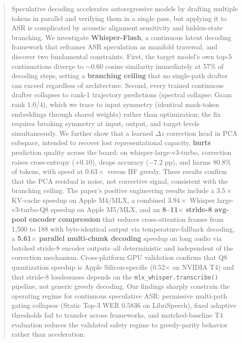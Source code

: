 \documentclass[11pt,a4paper]{article}
\begin{document}
\begin{abstract}
Speculative decoding accelerates autoregressive models by drafting multiple tokens in parallel and verifying them in a single pass, but applying it to ASR is complicated by acoustic alignment sensitivity and hidden-state branching.
We investigate \textbf{Whisper-Flash}, a continuous latent decoding framework that reframes ASR speculation as manifold traversal, and discover two fundamental constraints.
First, the target model's own top-5 continuations diverge to ${\sim}0.60$ cosine similarity immediately at 57\% of decoding steps, setting a \textbf{branching ceiling} that no single-path drafter can exceed regardless of architecture.
Second, every trained continuous drafter collapses to rank-1 trajectory predictions (spectral collapse: Gram rank 1.0/4), which we trace to input symmetry (identical mask-token embeddings through shared weights) rather than optimization; the fix requires breaking symmetry at input, output, and target levels simultaneously.
We further show that a learned $\Delta z$ correction head in PCA subspace, intended to recover lost representational capacity, \textbf{hurts} prediction quality across the board: on whisper-large-v3-turbo, correction raises cross-entropy ($+0.10$), drops accuracy ($-7.2$ pp), and harms 80.8\% of tokens, with speed at $0.63\times$ versus HF greedy.
These results confirm that the PCA residual is noise, not corrective signal, consistent with the branching ceiling.
The paper's positive engineering results include a $3.5\times$ KV-cache speedup on Apple M4/MLX, a combined $3.94\times$ Whisper large-v3-turbo-Q8 speedup on Apple M5/MLX, and an \textbf{8--11$\times$ stride-8 avg-pool encoder compression} that reduces cross-attention frames from 1,500 to 188 with byte-identical output via temperature-fallback decoding, a \textbf{5.61$\times$ parallel multi-chunk decoding} speedup on long audio via batched stride-8 encoder outputs--all deterministic and independent of the correction mechanism. Cross-platform GPU validation confirms that Q8 quantization speedup is Apple Silicon-specific (0.52$\times$ on NVIDIA T4) and that stride-8 losslessness depends on the \texttt{mlx\_whisper.transcribe()} pipeline, not generic greedy decoding.
Our findings sharply constrain the operating regime for continuous speculative ASR: permissive multi-path gating collapses (Static Top-3 WER $0.5836$ on LibriSpeech), fixed adaptive thresholds fail to transfer across frameworks, and matched-baseline T4 evaluation reduces the validated safety regime to greedy-parity behavior rather than acceleration.
\end{abstract}
\end{document}
